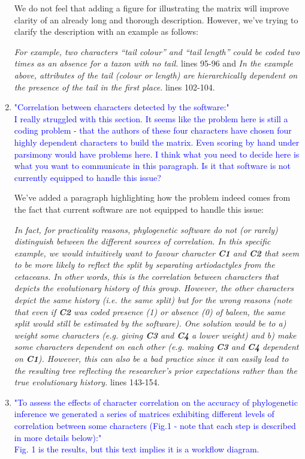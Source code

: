 \documentclass[12pt,letterpaper]{article}
\begin{document}
\begin{enumerate}
We do not feel that adding a figure for illustrating the matrix will improve clarity of an already long and thorough description.
However, we've trying to clarify the description with an example as follows:

\textit{For example, two characters ``tail colour'' and ``tail length'' could be coded two times as an absence for a taxon with no tail.} lines 95-96 and \textit{In the example above, attributes of the tail (colour or length) are hierarchically dependent on the presence of the tail in the first place.} lines 102-104.

\item{\textcolor{blue}{"Correlation between characters detected by the software:"\\
I really struggled with this section. It seems like the problem here is still a coding problem - that the authors of these four characters have chosen four highly dependent characters to build the matrix. Even scoring by hand under parsimony would have problems here. I think what you need to decide here is what you want to communicate in this paragraph. Is it that software is not currently equipped to handle this issue?}}

We've added a paragraph highlighting how the problem indeed comes from the fact that current software are not equipped to handle this issue:

\textit{In fact, for practicality reasons, phylogenetic software do not (or rarely) distinguish between the different sources of correlation.
In this specific example, we would intuitively want to favour character \textbf{C1} and \textbf{C2} that seem to be more likely to reflect the split by separating artiodactyles from the cetaceans.
In other words, this is the correlation between characters that depicts the evolutionary history of this group.
However, the other characters depict the same history (i.e. the same split) but for the wrong reasons (note that even if \textbf{C2} was coded presence (1) or absence (0) of baleen, the same split would still be estimated by the software).
One solution would be to a) weight some characters (e.g. giving \textbf{C3} and \textbf{C4} a lower weight) and b) make some characters dependent on each other (e.g. making \textbf{C3} and \textbf{C4} dependent on \textbf{C1}).
However, this can also be a bad practice since it can easily lead to the resulting tree reflecting the researcher's prior expectations rather than the true evolutionary history.} lines 143-154.

\item{\textcolor{blue}{"To assess the effects of character correlation on the accuracy of phylogenetic inference we generated a series of matrices exhibiting different levels of correlation between some characters (Fig.1 - note that each step is described in more details below):"\\
Fig. 1 is the results, but this text implies it is a workflow diagram.}}


\end{enumerate}
\end{document}
